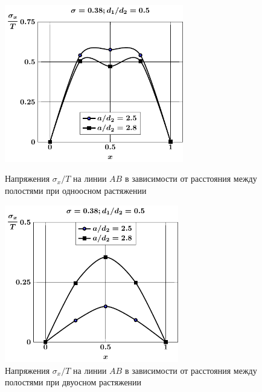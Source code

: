 \begin{russian}
\begin{figure}[h!]
\centering\footnotesize
\parbox[b]{7.5cm}{\centering\includegraphics[width=7.8cm]{periodic-oblate-cav27-a-d50-t1-sig_x.pdf}
\caption{Напряжения $\sigma_x/T$ на линии $AB$ в зависимости от расстояния между полостями при одноосном растяжении
\label{f:11:35}}}\hfil\hfil
\parbox[b]{7.5cm}{\centering\includegraphics[width=7.6cm]{periodic-oblate-cav27-a-d50-t2-sig_x.pdf}
\caption{Напряжения $\sigma_x/T$ на линии $AB$ в зависимости от расстояния между полостями при двуосном растяжении
\label{f:11:36}}}
\end{figure}


\end{russian}
